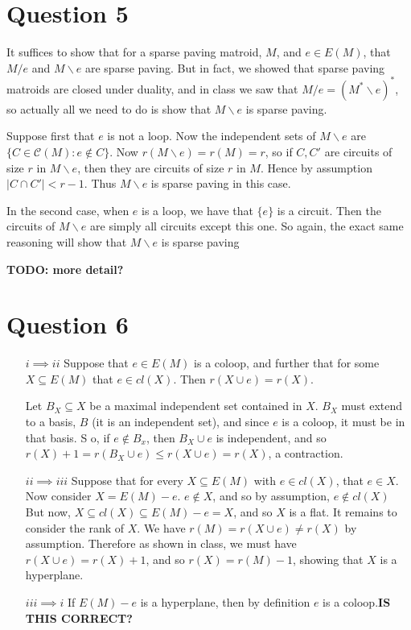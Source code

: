 \documentclass{article}
\begin{document}
\section*{Question 5}
It suffices to show that for a sparse paving matroid, $M$, and $e\in E(M)$, that $M/e$ and $M\backslash e$ are sparse paving.
But in fact, we showed that sparse paving matroids are closed under duality, and in class we saw that $M/e=(M^*\backslash e)^*$,
so actually all we need to do is show that $M\backslash e$ is sparse paving.

Suppose first that $e$ is not a loop.
Now the independent sets of $M\backslash e$ are $\{C\in\mathcal{C}(M): e\not\in C\}$.
Now $r(M\backslash e)=r(M)=r$, so if $C, C'$ are circuits of size $r$ in $M\backslash e$, then they are circuits of size $r$ in $M$.
Hence by assumption $|C\cap C'|<r-1$. Thus $M\backslash e$ is sparse paving in this case.

In the second case, when $e$ is a loop, we have that $\{e\}$ is a circuit. Then the circuits of $M\backslash e$ are simply all circuits 
except this one. So again, the exact same reasoning will show that $M\backslash e$ is sparse paving

\textbf{TODO: more detail?}

\section*{Question 6}
\begin{enumerate}
    \item[$i\implies ii$] Suppose that $e\in E(M)$ is a coloop, and further that for some $X\subseteq E(M)$ that $e\in cl(X)$.
        Then $r(X\cup e)=r(X)$.

        Let $B_X\subseteq X$ be a maximal independent set contained in $X$. $B_X$ must extend to a basis, $B$ (it is an independent set),
        and since $e$ is a coloop, it must be in that basis. S
        o, if $e\not\in B_x$, then $B_X\cup e$ is independent, 
        and so $r(X)+1=r(B_X\cup e)\le r(X\cup e)=r(X)$, a contraction.

    \item[$ii\implies iii$] Suppose that for every $X\subseteq E(M)$ with $e\in cl(X)$, that $e\in X$.
        Now consider $X=E(M)-e$. $e\not\in X$, and so by assumption, $e\not\in cl(X)$
        But now, $X\subseteq cl(X)\subseteq E(M)-e=X$, and so $X$ is a flat. It remains to consider the rank of 
        $X$. We have $r(M)=r(X\cup e)\ne r(X)$ by assumption. Therefore as shown in class, we must have $r(X\cup e)=r(X)+1$,
        and so $r(X)=r(M)-1$, showing that $X$ is a hyperplane.

    \item[$iii\implies i$] If $E(M)-e$ is a hyperplane, then by definition $e$ is a coloop.\textbf{IS THIS CORRECT?}
\end{enumerate}
\end{document}
